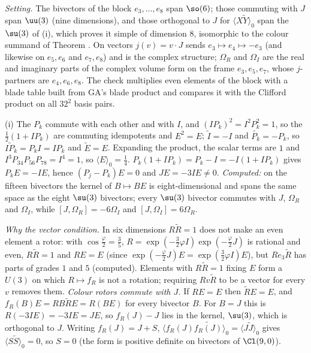 \emph{Setting.} The bivectors of the block $e_3, \dots, e_8$ span $\so(6)$; those commuting with $J$ span $\uu(3)$ (nine dimensions), and those orthogonal to $J$ for $\langle X\widetilde{Y}\rangle_0$ span the $\su(3)$ of (i), which proves it simple of dimension $8$, isomorphic to the colour summand of Theorem . On vectors $j(v) = v\cdot J$ sends $e_3 \mapsto e_4 \mapsto -e_3$ (and likewise on $e_5, e_6$ and $e_7, e_8$) and is the complex structure; $\Omega_R$ and $\Omega_I$ are the real and imaginary parts of the complex volume form on the frame $e_3, e_5, e_7$, whose $j$-partners are $e_4, e_6, e_8$. The check multiplies even elements of the block with a blade table built from GA's blade product and compares it with the Clifford product on all $32^2$ basis pairs.

(i) The $P_k$ commute with each other and with $I$, and $(IP_k)^2 = I^2P_k^2 = 1$, so the $\tfrac12(1 + IP_k)$ are commuting idempotents and $E^2 = E$; $\widetilde{I} = -I$ and $\widetilde{P_k} = -P_k$, so $\widetilde{IP_k} = P_kI = IP_k$ and $\widetilde{E} = E$. Expanding the product, the scalar terms are $1$ and $I^3P_{34}P_{56}P_{78} = I^4 = 1$, so $\langle E\rangle_0 = \tfrac14$. $P_k(1 + IP_k) = P_k - I = -I(1 + IP_k)$ gives $P_kE = -IE$, hence $(P_j - P_k)E = 0$ and $JE = -3IE \neq 0$. \emph{Computed:} on the fifteen bivectors the kernel of $B \mapsto BE$ is eight-dimensional and spans the same space as the eight $\su(3)$ bivectors; every $\su(3)$ bivector commutes with $J$, $\Omega_R$ and $\Omega_I$, while $[J, \Omega_R] = -6\Omega_I$ and $[J, \Omega_I] = 6\Omega_R$.

\emph{Why the vector condition.} In six dimensions $R\widetilde{R} = 1$ does not make an even element a rotor: with $\cos\tfrac\varphi2 = \tfrac35$, $R = \exp(-\tfrac32\varphi I)\exp(-\tfrac\varphi2J)$ is rational and even, $R\widetilde{R} = 1$ and $RE = E$ (since $\exp(-\tfrac\varphi2J)E = \exp(\tfrac32\varphi I)E$), but $Re_3\widetilde{R}$ has parts of grades $1$ and $5$ (computed). Elements with $R\widetilde{R} = 1$ fixing $E$ form a $U(3)$ on which $R \mapsto f_R$ is not a rotation; requiring $Rv\widetilde{R}$ to be a vector for every $v$ removes them. \emph{Colour rotors commute with $J$.} If $RE = E$ then $\widetilde{R}E = E$, and $f_R(B)E = RB\widetilde{R}E = R(BE)$ for every bivector $B$. For $B = J$ this is $R(-3IE) = -3IE = JE$, so $f_R(J) - J$ lies in the kernel, $\su(3)$, which is orthogonal to $J$. Writing $f_R(J) = J + S$, $\langle f_R(J)\widetilde{f_R(J)}\rangle_0 = \langle J\widetilde{J}\rangle_0$ gives $\langle S\widetilde{S}\rangle_0 = 0$, so $S = 0$ (the form is positive definite on bivectors of $\Cl(9,0)$).

